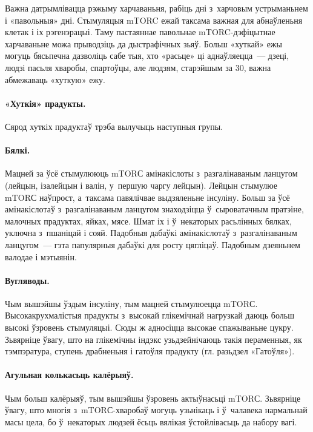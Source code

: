 
Важна датрымлівацца рэжыму харчаваньня, рабіць дні з~харчовым устрыманьнем і «павольныя» дні. Стымуляцыя mTORC ежай таксама важная для абнаўленьня клетак і іх рэгенэрацыі. Таму пастаяннае павольнае mTORC-дэфіцытнае харчаваньне можа прыводзіць да дыстрафічных зьяў. Больш «хуткай» ежы могуць бясьпечна дазволіць сабе тыя, хто «расьце» ці аднаўляецца~--- дзеці, людзі пасьля хваробы, спартоўцы, але людзям, старэйшым за 30, важна абмежаваць «хуткую» ежу.

\paragraph{«Хуткія» прадукты.}
Сярод хуткіх прадуктаў трэба вылучыць наступныя групы.

\paragraph{Бялкі.}
Мацней за ўсё стымулююць mTORС амінакіслоты з~разгалінаваным ланцугом (лейцын, ізалейцын і валін, у~першую чаргу лейцын). Лейцын стымулюе mTORС наўпрост, а~таксама павялічвае выдзяленьне інсуліну. Больш за ўсё амінакіслотаў з~разгалінаваным ланцугом знаходзіцца ў~сыроватачным пратэіне, малочных прадуктах, яйках, мясе. Шмат іх і ў~некаторых расьлінных бялках, уключна з~пшаніцай і сояй. Падобныя дабаўкі амінакіслотаў з~разгалінаваным ланцугом~--- гэта папулярныя дабаўкі для росту цягліцаў. Падобным дзеяньнем валодае і мэтыянін.

\paragraph{Вугляводы.}
Чым вышэйшы ўздым інсуліну, тым мацней стымулюецца mTORС. Высокакрухмалістыя прадукты з~высокай глікемічнай нагрузкай даюць больш высокі ўзровень стымуляцыі. Сюды ж адносіцца высокае спажываньне цукру. Зьвярніце ўвагу, што на глікемічны індэкс узьдзейнічаюць такія пераменныя, як тэмпэратура, ступень драбненьня і гатоўля прадукту (гл. разьдзел «Гатоўля»).

\paragraph{Агульная колькасьць калёрыяў.}
Чым больш калёрыяў, тым вышэйшы ўзровень актыўнасьці mTORС. Зьвярніце ўвагу, што многія з~mTORС-хваробаў могуць узьнікаць і ў~чалавека нармальнай масы цела, бо ў~некаторых людзей ёсьць вялікая ўстойлівасьць да набору вагі.

